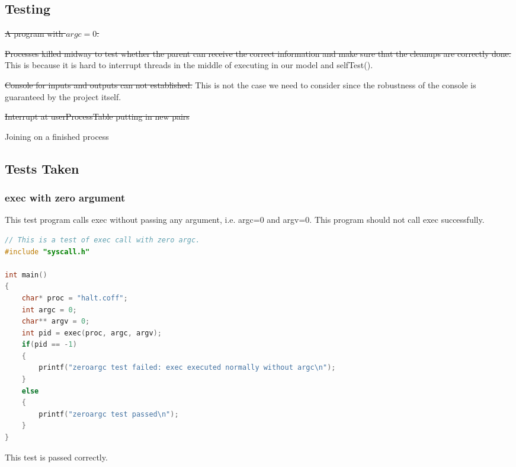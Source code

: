\documentclass{article}
\begin{document}
\begin{spacing}{1.1}
\subsection{Testing}
\begin{asparaitem}
  \item {\color{red}\sout{A program with $argc=0$.}}
  \item {\color{red}\sout{Processes killed midway to test whether the parent can receive the correct information and make sure that the cleanups are correctly done.}} This is because it is hard to interrupt threads in the middle of      executing in our model and \textsf{selfTest}().
  \item {\color{red} \sout{Console for inputs and outputs can not established.}} This is not the case we need to consider since the robustness of the console is guaranteed by the project itself.

  \item {\color{red}\sout{Interrupt at userProcessTable putting in new pairs}}
  \item Joining on a finished process
\end{asparaitem}

\subsection{Tests Taken}
\subsubsection{\textsf{exec} with zero argument}
This test program calls \textsf{exec} without passing any argument, i.e. \textsf{argc}=0 and \textsf{argv}=0. This program should not call \textsf{exec} successfully.
\begin{lstlisting}[language=C]
// This is a test of exec call with zero argc.
#include "syscall.h"

int main()
{
    char* proc = "halt.coff";
    int argc = 0;
    char** argv = 0;
    int pid = exec(proc, argc, argv);
    if(pid == -1)
    {
        printf("zeroargc test failed: exec executed normally without argc\n");
    }
    else
    {
        printf("zeroargc test passed\n");
    }
}
\end{lstlisting}
This test is passed correctly.

\end{spacing}
\end{document}
